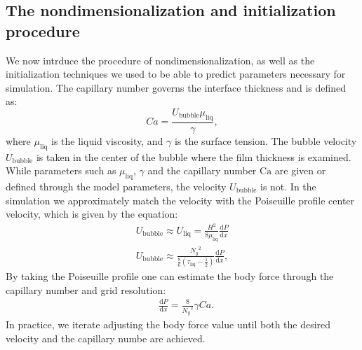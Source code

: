 \documentclass{article}
\newcommand{\Ca}{\mathrm{Ca}}
\begin{document}
\subsection{The nondimensionalization and initialization procedure}
We now intrduce the procedure of nondimensionalization, as well as
the initialization techniques we used to be able to predict parameters necessary for
simulation. The capillary number governs the interface thickness and is defined as:
\begin{equation}
Ca=\frac{U_{\mathrm{bubble}} \mu_{\mathrm{liq}}}{\gamma},
\end{equation}
where $\mu_{\mathrm{liq}}$ is the liquid viscosity, and $\gamma$ is the surface tension. The
bubble velocity $U_{\mathrm{bubble}}$ is taken in the center of the bubble where the film
thickness is examined.
While parameters such as $\mu_{\mathrm{liq}}$, $\gamma$ and the capillary number $\Ca$ are given
or defined through the model parameters, the velocity $U_{\mathrm{bubble}}$ is not.
In the simulation we approximately match the velocity with the
Poiseuille profile center velocity, which is given by the equation:
\begin{equation}
\begin{aligned}
U_{\mathrm{bubble}} \approx U_{\mathrm{liq}}=\frac{H^2}{8
\mu_{\mathrm{liq}}}\frac{\mathrm{d}P}{\mathrm{d}x}\\
U_{\mathrm{bubble}}\approx
\frac{{N_y}^2}{\frac{8}{6}(\tau_{\mathrm{liq}}-\frac{1}{2})}\frac{\mathrm{d}P}{\mathrm{d}
x } ,
\end{aligned}
\end{equation}
By taking the Poiseuille profile one can estimate the body force through the
capillary number and grid resolution:
\begin{equation}
\label{poiseuille:velocity:center}
\begin{aligned}
&\frac{\mathrm{d}P}{\mathrm{d}x}=\frac{8}{{N_y}^2}\gamma Ca.
\end{aligned}
\end{equation}
In practice, we iterate adjusting the body force value until both the desired velocity and the
capillary numbe are achieved.
\end{document}

